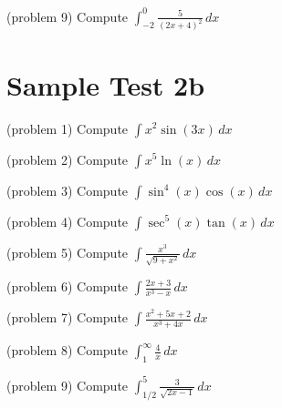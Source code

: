 \documentclass[handout]{ximera}
\begin{document}
\begin{problem}(problem 9)
Compute $\displaystyle \int_{-2}^0 \frac{5}{(2x+4)^2} \, dx$
\end{problem}




\section{Sample Test 2b}





\begin{problem}(problem 1)
Compute $\displaystyle \int x^2\sin(3x) \, dx$

\end{problem}


\begin{problem}(problem 2)
Compute $\displaystyle \int x^5 \ln(x) \, dx$

\end{problem}

\begin{problem}(problem 3)
Compute $\displaystyle \int \sin^4(x) \cos(x) \, dx$

\end{problem}

\begin{problem}(problem 4)
Compute $\displaystyle \int \sec^5(x) \tan(x)  \, dx$

\end{problem}

\begin{problem}(problem 5)
Compute $\displaystyle \int \frac{x^3}{ \sqrt{9+x^2}} \, dx$

\end{problem}

\begin{problem}(problem 6)
Compute $\displaystyle \int \frac{2x+3}{x^3-x} \, dx$

\end{problem}

\begin{problem}(problem 7)
Compute $\displaystyle \int \frac{x^2 + 5x + 2}{x^3 + 4x} \, dx$

\end{problem}

\begin{problem}(problem 8)
Compute $\displaystyle \int_1^\infty \frac{4}{x} \, dx$

\end{problem}

\begin{problem}(problem 9)
Compute $\displaystyle \int_{1/2}^5 \frac{3}{\sqrt{2x-1}} \, dx$
\end{problem}
\end{document}
